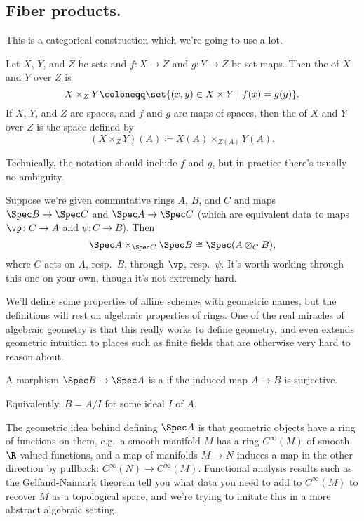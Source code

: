 \subsection*{Fiber products.}
This is a categorical construction which we're going to use a lot.
\begin{defn}
Let $X$, $Y$, and $Z$ be sets and $f\colon X\to Z$ and $g\colon Y\to Z$ be set maps. Then the 
of $X$ and $Y$ over $Z$ is
\begin{equation}
	X\times_Z Y\coloneqq\set{(x,y)\in X\times Y\mid f(x) =g(y)}.
\end{equation}
If $X$, $Y$, and $Z$ are spaces, and $f$ and $g$ are maps of spaces, then the  of $X$ and $Y$
over $Z$ is the space defined by
\begin{equation}
	(X\times_Z Y)(A)\coloneqq X(A)\times_{Z(A)} Y(A).
\end{equation}
\end{defn}
Technically, the notation should include $f$ and $g$, but in practice there's usually no ambiguity.
\begin{exm}
Suppose we're given commutative rings $A$, $B$, and $C$ and maps $\Spec B\to\Spec C$ and $\Spec A\to\Spec C$ (which
are equivalent data to maps $\vp\colon C\to A$ and $\psi\colon C\to B$). Then
\[\Spec A\times_{\Spec C}\Spec B \cong \Spec (A\otimes_C B),\]
where $C$ acts on $A$, resp.\ $B$, through $\vp$, resp.\ $\psi$. It's worth working through this one on your own,
though it's not extremely hard.
\end{exm}
We'll define some properties of affine schemes with geometric names, but the definitions will rest on algebraic
properties of rings. One of the real miracles of algebraic geometry is that this really works to define geometry,
and even extends geometric intuition to places such as finite fields that are otherwise very hard to reason about.
\begin{defn}
\label{closedemb}
A morphism $\Spec B\to\Spec A$ is a  if the induced map $A\to B$ is surjective.
\end{defn}
Equivalently, $B = A/I$ for some ideal $I$ of $A$.

The geometric idea behind defining $\Spec A$ is that geometric objects have a ring of functions on them, e.g.\ a
smooth manifold $M$ has a ring $C^\infty(M)$ of smooth $\R$-valued functions, and a map of manifolds $M\to N$
induces a map in the other direction by pullback: $C^\infty(N)\to C^\infty(M)$. Functional analysis results such as
the Gelfand-Naimark theorem tell you what data you need to add to $C^\infty(M)$ to recover $M$ as a topological
space, and we're trying to imitate this in a more abstract algebraic setting.

